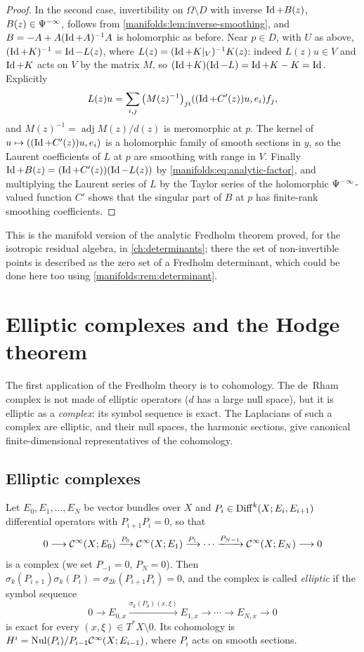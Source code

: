 \begin{proof}
In the second case, invertibility on $\Omega\setminus D$ with inverse $\operatorname{Id}+B(z)$,
$B(z)\in\Psi^{-\infty}$, follows from \cref{manifolds:lem:inverse-smoothing}, and
$B=-A+A(\operatorname{Id}+A)^{-1}A$ is holomorphic as before. Near $p\in D$, with $U$ as above,
$(\operatorname{Id}+K)^{-1}=\operatorname{Id}-L(z)$, where $L(z)=(\operatorname{Id}+K|_V)^{-1}K(z)$: indeed $L(z)u\in V$ and
$\operatorname{Id}+K$ acts on $V$ by the matrix $M$, so $(\operatorname{Id}+K)(\operatorname{Id}-L)=\operatorname{Id}+K-K=\operatorname{Id}$. Explicitly
\begin{equation*}
L(z)u=\sum_{i,j}\big(M(z)^{-1}\big)_{ji}( (\operatorname{Id}+C'(z))u, e_i)f_j,
\end{equation*}
and $M(z)^{-1}=\operatorname{adj}M(z)/d(z)$ is meromorphic at $p$. The kernel of
$u\mapsto( (\operatorname{Id}+C'(z))u, e_i)$ is a holomorphic family of smooth sections in $y$,
so the Laurent coefficients of $L$ at $p$ are smoothing with range in $V$. Finally
$\operatorname{Id}+B(z)=(\operatorname{Id}+C'(z))(\operatorname{Id}-L(z))$ by \eqref{manifolds:eq:analytic-factor}, and
multiplying the Laurent series of $L$ by the Taylor series of the holomorphic
$\Psi^{-\infty}$-valued function $C'$ shows that the singular part of $B$ at $p$ has
finite-rank smoothing coefficients.
\end{proof}

This is the manifold version of the analytic Fredholm theorem proved, for the
isotropic residual algebra, in \cref{ch:determinants}; there the set of non-invertible
points is described as the zero set of a Fredholm determinant, which could be done
here too using \cref{manifolds:rem:determinant}.

\section{Elliptic complexes and the Hodge theorem}\label{manifolds:sec:hodge}
The first application of the Fredholm theory is to cohomology. The de~Rham
complex is not made of elliptic operators ($d$ has a large null space), but
it is elliptic as a \emph{complex}: its symbol sequence is exact. The
Laplacians of such a complex are elliptic, and their null spaces, the
harmonic sections, give canonical finite-dimensional representatives of the
cohomology.

\subsection{Elliptic complexes}
Let $E_0,E_1,\dots,E_N$ be vector bundles over $X$ and $P_i\in\operatorname{Diff}^{k}(X;E_i,E_{i+1})$
differential operators with $P_{i+1}P_i=0$, so that
\begin{equation}\label{manifolds:eq:complex}
0\longrightarrow\mathcal{C}^\infty(X;E_0)\xrightarrow{P_0}\mathcal{C}^\infty(X;E_1)\xrightarrow{P_1}\cdots
\xrightarrow{P_{N-1}}\mathcal{C}^\infty(X;E_N)\longrightarrow0
\end{equation}
is a complex (we set $P_{-1}=0$, $P_N=0$). Then
$\sigma_k(P_{i+1})\sigma_k(P_i)=\sigma_{2k}(P_{i+1}P_i)=0$, and the complex is called
\emph{elliptic} if the symbol sequence
\begin{equation*}
0\to E_{0,x}\xrightarrow{\sigma_k(P_0)(x,\xi)}E_{1,x}\to\cdots\to E_{N,x}\to0
\end{equation*}
is exact for every $(x,\xi)\in T^*X\setminus0$. Its cohomology is
$H^i=\operatorname{Nul}(P_i)/P_{i-1}\mathcal{C}^\infty(X;E_{i-1})$, where $P_i$ acts on smooth sections.


